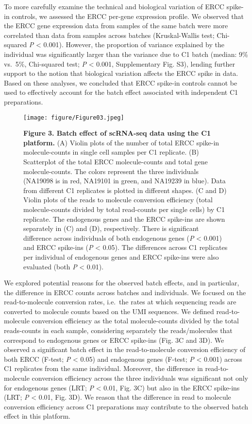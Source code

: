 To more carefully examine the technical and biological variation of ERCC
spike-in controls, we assessed the ERCC per-gene expression profile. We
observed that the ERCC gene expression data from samples of the same
batch were more correlated than data from samples across batches
(Kruskal-Wallis test; Chi-squared \emph{P} \textless{} 0.001). However,
the proportion of variance explained by the individual was significantly
larger than the variance due to C1 batch (median: 9\% vs.~5\%,
Chi-squared test; \emph{P} \textless{} 0.001, Supplementary Fig. S3),
lending further support to the notion that biological variation affects
the ERCC spike in data. Based on these analyses, we concluded that ERCC
spike-in controls cannot be used to effectively account for the batch
effect associated with independent C1 preparations.

\begin{figure}[htbp]
\centering
\texttt{[image: figure/Figure03.jpeg]}
\caption{\textbf{Figure 3. Batch effect of scRNA-seq data using the C1
platform.} (A) Violin plots of the number of total ERCC spike-in
molecule-counts in single cell samples per C1 replicate. (B) Scatterplot
of the total ERCC molecule-counts and total gene molecule-counts. The
colors represent the three individuals (NA19098 is in red, NA19101 in
green, and NA19239 in blue). Data from different C1 replicates is
plotted in different shapes. (C and D) Violin plots of the reads to
molecule conversion efficiency (total molecule-counts divided by total
read-counts per single cells) by C1 replicate. The endogenous genes and
the ERCC spike-ins are shown separately in (C) and (D), respectively.
There is significant difference across individuals of both endogenous
genes (\emph{P} \textless{} 0.001) and ERCC spike-ins (\emph{P}
\textless{} 0.05). The differences across C1 replicates per individual
of endogenous genes and ERCC spike-ins were also evaluated (both
\emph{P} \textless{} 0.01).}
\end{figure}

We explored potential reasons for the observed batch effects, and in
particular, the difference in ERCC counts across batches and
individuals. We focused on the read-to-molecule conversion rates,
i.e.~the rates at which sequencing reads are converted to molecule
counts based on the UMI sequences. We defined read-to-molecule
conversion efficiency as the total molecule-counts divided by the total
reads-counts in each sample, considering separately the reads/molecules
that correspond to endogenous genes or ERCC spike-ins (Fig. 3C and 3D).
We observed a significant batch effect in the read-to-molecule
conversion efficiency of both ERCC (F-test; \emph{P} \textless{} 0.05)
and endogenous genes (F-test; \emph{P} \textless{} 0.001) across C1
replicates from the same individual. Moreover, the difference in
read-to-molecule conversion efficiency across the three individuals was
significant not only for endogenous genes (LRT; \emph{P} \textless{}
0.01, Fig. 3C) but also in the ERCC spike-ins (LRT; \emph{P} \textless{}
0.01, Fig. 3D). We reason that the difference in read to molecule
conversion efficiency across C1 preparations may contribute to the
observed batch effect in this platform.

